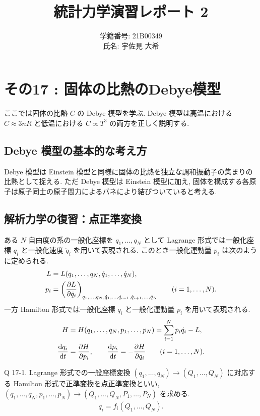 \documentclass[uplatex,dvipdfmx,a4paper,11pt]{jlreq}
\theoremstyle{definition}
\begin{document}
\title{統計力学演習レポート 2}
\author{
  学籍番号: 21B00349\\
  氏名: 宇佐見 大希\\
}
\maketitle
\tableofcontents
\clearpage


\section{その17 : 固体の比熱のDebye模型}
ここでは固体の比熱 $C$ の Debye 模型を学ぶ. Debye 模型は高温における $C\approx 3nR$ と低温における $C\propto T^3$ の両方を正しく説明する.
\subsection{Debye 模型の基本的な考え方}
Debye 模型は Einstein 模型と同様に固体の比熱を独立な調和振動子の集まりの比熱として捉える. ただ Debye 模型は Einstein 模型に加え, 固体を構成する各原子は原子同士の原子間力によるバネにより結びついていると考える.

\subsection{解析力学の復習：点正準変換}
ある $N$ 自由度の系の一般化座標を $q_1, \ldots, q_N$ として Lagrange 形式では一般化座標 $q_i$ と一般化速度 $\dot{q}_i$ を用いて表現される. このとき一般化運動量 $p_i$ は次のように定められる.
\begin{align}
  L   & = L(q_1,\ldots,q_N,\dot{q}_1,\ldots,\dot{q}_N),                                                                                    \\
  p_i & = \qty(\pdv{L}{\dot{q}_i})_{q_1,\ldots,q_N,\dot{q}_1,\ldots,\dot{q}_{i-1},\dot{q}_{i+1},\ldots,\dot{q}_N} \qquad (i = 1,\ldots,N).
\end{align}
一方 Hamilton 形式では一般化座標 $q_i$ と一般化運動量 $p_i$ を用いて表現される.
\begin{align}
  H           & = H(q_1,\ldots,q_N,p_1,\ldots,p_N) = \sum_{i=1}^{N}p_i\dot{q}_i - L,        \\
  \dv{q_i}{t} & = \pdv{H}{p_i}, \qquad \dv{p_i}{t} = -\pdv{H}{q_i} \qquad (i = 1,\ldots,N).
\end{align}

\begin{itembox}[l]{Q 17-1.}
  Lagrange 形式での一般座標変換 $(q_1,\ldots,q_N)\to(Q_1,\ldots,Q_N)$ に対応する Hamilton 形式で正準変換を点正準変換といい, $(q_1,\ldots,q_N,p_1,\ldots,p_N)\to(Q_1,\ldots,Q_N,P_1,\ldots,P_N)$ を求める.
  \begin{align}
    q_i = f_i(Q_1,\ldots,Q_N).
  \end{align}
\end{itembox}
\end{document}
